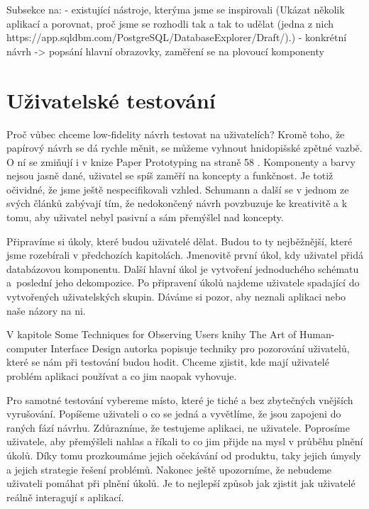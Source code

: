 Subsekce na:
- existující nástroje, kterýma jsme se inspirovali (Ukázat několik aplikací a porovnat, proč jsme se rozhodli tak a tak to udělat (jedna z nich https://app.sqldbm.com/PostgreSQL/DatabaseExplorer/Draft/).)
- konkrétní návrh -> popsání hlavní obrazovky, zaměření se na plovoucí komponenty

\section{Uživatelské testování}

Proč vůbec chceme low-fidelity návrh testovat na uživatelích? Kromě toho, že papírový návrh se dá rychle měnit, se můžeme vyhnout hnidopišské zpětné vazbě. O ní se zmiňují i v knize Paper Prototyping na straně 58 \cite{Paper_Prototyping}. Komponenty a barvy nejsou jasně dané, uživatel se spíš zaměří na koncepty a funkčnost. Je totiž očividné, že jsme ještě nespecifikovali vzhled. Schumann a další se v jednom ze svých článků \cite{Schumann_1996_AEN} zabývají tím, že nedokončený návrh povzbuzuje ke kreativitě a k tomu, aby uživatel nebyl pasivní a sám přemýšlel nad koncepty. 

Připravíme si úkoly, které budou uživatelé dělat. Budou to ty nejběžnější, které jsme rozebírali v předchozích kapitolách. Jmenovitě první úkol, kdy uživatel přidá databázovou komponentu. Další hlavní úkol je vytvoření jednoduchého schématu a~poslední jeho dekompozice.
Po připravení úkolů najdeme uživatele spadající do vytvořených uživatelských skupin. Dáváme si pozor, aby neznali aplikaci nebo naše názory na ni.

V kapitole Some Techniques for Observing Users knihy The Art of Human-computer Interface Design \cite{Brenda_1990_art} autorka popisuje techniky pro pozorování uživatelů, které se nám při testování budou hodit. Chceme zjistit, kde mají uživatelé problém aplikaci používat a co jim naopak vyhovuje.

Pro samotné testování vybereme místo, které je tiché a bez zbytečných vnějších vyrušování. Popíšeme uživateli o co se jedná a vyvětlíme, že jsou zapojeni do raných fází návrhu. Zdůrazníme, že testujeme aplikaci, ne uživatele. Poprosíme uživatele, aby přemýšleli nahlas a říkali to co jim přijde na mysl v průběhu plnění úkolů. Díky tomu prozkoumáme jejich očekávání od produktu, taky jejich úmysly a jejich strategie řešení problémů. Nakonec ještě upozorníme, že nebudeme uživateli pomáhat při plnění úkolů. Je to nejlepší způsob jak zjistit jak uživatelé reálně interagují s aplikací.

